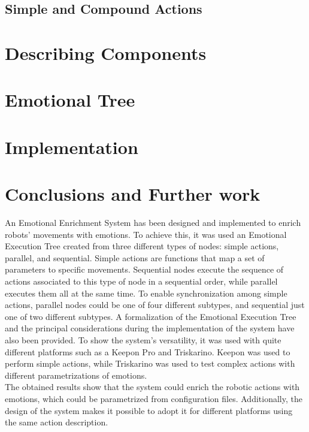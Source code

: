 \documentclass[letterpaper, 10 pt, conference]{ieeeconf}  %
\begin{document}
\subsection{Simple and Compound Actions}
 
\section{Describing Components}

\section{Emotional Tree}

\section{Implementation}

\section{Conclusions and Further work}
An Emotional Enrichment System has been designed and implemented to enrich robots' movements with emotions. To achieve this, it was used an Emotional Execution Tree created from three different types of nodes: simple actions, parallel, and sequential. Simple actions are functions that map a set of parameters to specific movements. Sequential nodes execute the sequence of actions associated to this type of node in a sequential order, while parallel executes them all at the same time. To enable synchronization among simple actions, parallel nodes could be one of four different subtypes, and sequential just one of two different subtypes. A formalization of the Emotional Execution Tree and the principal considerations during the implementation of the system have also been provided. To show the system's versatility, it was used with quite different platforms such as a Keepon Pro and Triskarino. Keepon was used to perform simple actions, while Triskarino was used to test complex actions with different parametrizations of emotions.\\
The obtained results show that the system could enrich the robotic actions with emotions, which could be parametrized from configuration files. Additionally, the design of the system makes it possible to  adopt it for different platforms using the same action description.
%



\addtolength{\textheight}{-12cm}
\end{document}

